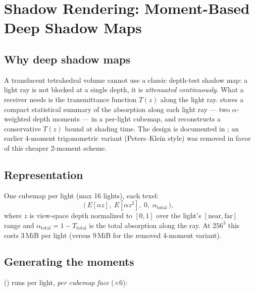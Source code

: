 \chapter{Shadow Rendering: Moment-Based Deep Shadow Maps}\label{ch:shadow-rendering}

\section{Why deep shadow maps}

A translucent tetrahedral volume cannot use a classic depth-test shadow map:
a light ray is not blocked at a single depth, it is \emph{attenuated
continuously}. What a receiver needs is the transmittance function $T(z)$
along the light ray.  stores a compact statistical summary
of the absorption along each light ray --- two $\alpha$-weighted depth
moments --- in a per-light cubemap, and reconstructs a conservative $T(z)$
bound at shading time. The design is documented in ; an earlier
4-moment trigonometric variant (Peters--Klein style) was removed in favor of
this cheaper 2-moment scheme.

\section{Representation}

One  cubemap per light (max 16 lights), each texel:
\[
  \big(\, E[\alpha z],\; E[\alpha z^2],\; 0,\; \alpha_{\text{total}} \,\big),
\]
where $z$ is view-space depth normalized to $[0,1]$ over the light's
$[\text{near}, \text{far}]$ range and
$\alpha_{\text{total}} = 1 - T_{\text{total}}$ is the total absorption along
the ray. At $256^3$ this costs 3\,MiB per light (versus 9\,MiB for the
removed 4-moment variant).

\section{Generating the moments}

 () runs
per light, \emph{per cubemap face} ($\times 6$):

